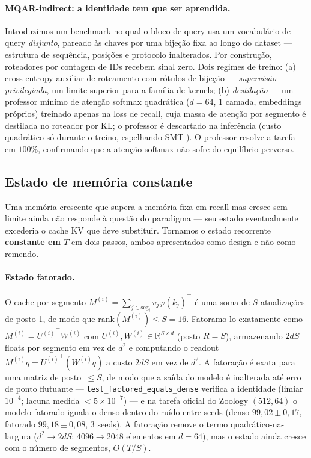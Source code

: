 \documentclass[11pt]{article}
\begin{document}
\paragraph{MQAR-indirect: a identidade tem que ser aprendida.} Introduzimos um
benchmark no qual o bloco de query usa um vocabul\'ario de query \emph{disjunto},
pareado \`as chaves por uma bije\c{c}\~ao fixa ao longo do dataset --- estrutura de
sequ\^encia, posi\c{c}\~oes e protocolo inalterados. Por constru\c{c}\~ao,
roteadores por contagem de IDs recebem sinal zero. Dois regimes de treino: (a)
cross-entropy auxiliar de roteamento com r\'otulos de bije\c{c}\~ao ---
\emph{supervis\~ao privilegiada}, um limite superior para a fam\'ilia de kernels;
(b) \emph{destila\c{c}\~ao} --- um professor m\'inimo de aten\c{c}\~ao softmax
quadr\'atica ($d=64$, 1 camada, embeddings pr\'oprios) treinado apenas na loss de
recall, cuja massa de aten\c{c}\~ao por segmento \'e destilada no roteador por KL;
o professor \'e descartado na infer\^encia (custo quadr\'atico s\'o durante o
treino, espelhando SMT \citep{kumar2026smt}). O professor resolve a tarefa em
$100\%$, confirmando que a aten\c{c}\~ao softmax n\~ao sofre do equil\'ibrio
perverso.

\subsection{Estado de mem\'oria constante}

Uma mem\'oria crescente que supera a mem\'oria fixa em recall mas cresce sem
limite ainda n\~ao responde \`a quest\~ao do paradigma --- seu estado eventualmente
excederia o cache KV que deve substituir. Tornamos o estado recorrente
\textbf{constante em $T$} em dois passos, ambos apresentados como design e n\~ao
como remendo.

\paragraph{Estado fatorado.} O cache por segmento
$M^{(i)}=\sum_{j\in\mathrm{seg}_i}v_j\varphi(k_j)^\top$ \'e uma soma de $S$
atualiza\c{c}\~oes de posto 1, de modo que $\mathrm{rank}(M^{(i)})\le S=16$.
Fatoramo-lo exatamente como $M^{(i)}={U^{(i)}}^\top W^{(i)}$ com
$U^{(i)},W^{(i)}\in\mathbb{R}^{S\times d}$ (posto $R=S$), armazenando $2dS$ floats
por segmento em vez de $d^2$ e computando o readout
$M^{(i)}q = {U^{(i)}}^\top(W^{(i)}q)$ a custo $2dS$ em vez de $d^2$. A
fatora\c{c}\~ao \'e exata para uma matriz de posto~$\le S$, de modo que a sa\'ida
do modelo \'e inalterada at\'e erro de ponto flutuante ---
\texttt{test\_factored\_equals\_dense} verifica a identidade (limiar $10^{-4}$;
lacuna medida $<\!5\times10^{-7}$) --- e na tarefa oficial do Zoology $(512,64)$ o
modelo fatorado iguala o denso dentro do ru\'ido entre seeds (denso
$99{,}02\pm0{,}17$, fatorado $99{,}18\pm0{,}08$, 3 seeds). A fatora\c{c}\~ao
remove o termo quadr\'atico-na-largura ($d^2\to 2dS$: $4096\to 2048$ elementos em
$d=64$), mas o estado ainda cresce com o n\'umero de segmentos, $O(T/S)$.
\end{document}
